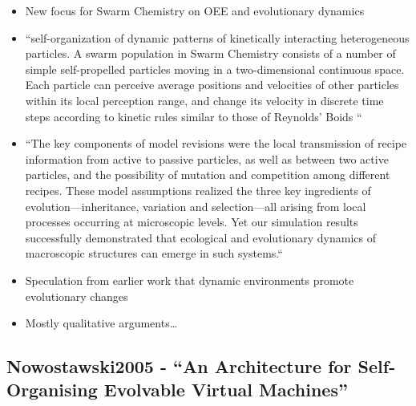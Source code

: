 		\begin{itemize}
			\item
			
			New focus for Swarm Chemistry on OEE and evolutionary dynamics
			
			\item
			
			``self-organization of dynamic patterns of kinetically interacting
			heterogeneous particles. A swarm population in Swarm Chemistry
			consists of a number of simple self-propelled particles moving in a
			two-dimensional continuous space. Each particle can perceive average
			positions and velocities of other particles within its local
			perception range, and change its velocity in discrete time steps
			according to kinetic rules similar to those of Reynolds' Boids ``
			
			\item
			
			``The key components of model revisions were the local transmission of
			recipe information from active to passive particles, as well as
			between two active particles, and the possibility of mutation and
			competition among different recipes. These model assumptions realized
			the three key ingredients of evolution---inheritance, variation and
			selection---all arising from local processes occurring at microscopic
			levels. Yet our simulation results successfully demonstrated that
			ecological and evolutionary dynamics of macroscopic structures can
			emerge in such systems.``
			
			\item
			
			Speculation from earlier work that dynamic environments promote
			evolutionary changes
			
			\item
			
			Mostly qualitative arguments\ldots{}
			
		\end{itemize}
		
		\hypertarget{nowostawski2005---an-architecture-for-self-organising-evolvable-virtual-machines}{\subsection{Nowostawski2005
				- ``An Architecture for Self-Organising Evolvable Virtual
				Machines''}\label{nowostawski2005---an-architecture-for-self-organising-evolvable-virtual-machines}}
		
